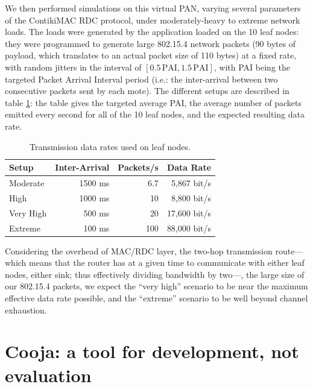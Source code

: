 \documentclass[12pt,a4paper]{article}
\begin{document}
We then performed simulations on this virtual PAN, varying several parameters
of the ContikiMAC RDC protocol, under moderately-heavy to extreme network
loads. The loads were generated by the application loaded on the 10 leaf
nodes: they were programmed to generate large 802.15.4 network packets
(90 bytes of payload, which translates to an actual packet size of
110 bytes) at a fixed rate, with random jitters in the interval of
$[ 0.5\,\mathrm{PAI} , 1.5\,\mathrm{PAI} ]$, with PAI being the targeted
Packet Arrival Interval period (i.e.: the inter-arrival between two
consecutive packets sent by each mote). The different setups are described
in table \ref{TblDataRates}: the table gives the targeted average PAI,
the average number of packets emitted every second for all of the
10 leaf nodes, and the expected resulting data rate.

\begin{table}[htb]
\centering
\begin{tabular}{|l|r|r|r|}
\hline
Setup     & Inter-Arrival & Packets/s & Data Rate \\
\hline
Moderate  &    1500 ms    &    6.7    &  5,867 bit/s \\ 
High      &    1000 ms    &   10      &  8,800 bit/s \\
Very High &     500 ms    &   20      & 17,600 bit/s \\
Extreme   &     100 ms    &  100      & 88,000 bit/s \\
\hline
\end{tabular}
\caption{Transmission data rates used on leaf nodes.}
\label{TblDataRates}
\end{table}

Considering the overhead of MAC/RDC layer, the two-hop transmission
route---which means that the router has at a given time to communicate with
either leaf nodes, either sink; thus effectively dividing bandwidth by two---,
the large size of our 802.15.4 packets, we expect the ``very high'' scenario
to be near the maximum effective data rate possible, and the ``extreme''
scenario to be well beyond channel exhaustion.



\section{Cooja: a tool for development, not evaluation}
\label{SectCoojaDevNotEval}
\end{document}
